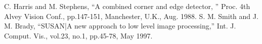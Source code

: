 \begin{thebibliography}{9}
     C. Harris and M. Stephens,
      ``A combined corner and edge detector, '' Proc. 4th Alvey Vision Conf.,
      pp.147-151, Manchester, U.K., Aug. 1988.
     S. M. Smith and J. M. Brady,
      ``SUSAN|A new approach to low level image processing,'' Int. J. Comput.
      Vis., vol.23, no.1, pp.45-78, May 1997.
\end{thebibliography}